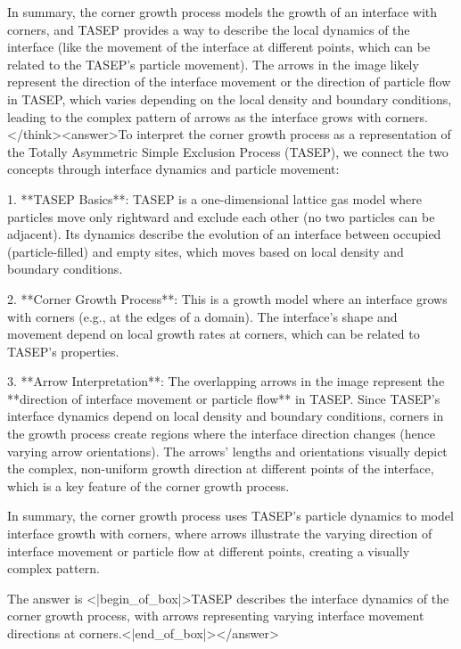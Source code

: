 In summary, the corner growth process models the growth of an interface with corners, and TASEP provides a way to describe the local dynamics of the interface (like the movement of the interface at different points, which can be related to the TASEP's particle movement). The arrows in the image likely represent the direction of the interface movement or the direction of particle flow in TASEP, which varies depending on the local density and boundary conditions, leading to the complex pattern of arrows as the interface grows with corners.</think><answer>To interpret the corner growth process as a representation of the Totally Asymmetric Simple Exclusion Process (TASEP), we connect the two concepts through interface dynamics and particle movement:  

1. **TASEP Basics**: TASEP is a one-dimensional lattice gas model where particles move only rightward and exclude each other (no two particles can be adjacent). Its dynamics describe the evolution of an interface between occupied (particle-filled) and empty sites, which moves based on local density and boundary conditions.  

2. **Corner Growth Process**: This is a growth model where an interface grows with corners (e.g., at the edges of a domain). The interface’s shape and movement depend on local growth rates at corners, which can be related to TASEP’s properties.  

3. **Arrow Interpretation**: The overlapping arrows in the image represent the **direction of interface movement or particle flow** in TASEP. Since TASEP’s interface dynamics depend on local density and boundary conditions, corners in the growth process create regions where the interface direction changes (hence varying arrow orientations). The arrows’ lengths and orientations visually depict the complex, non-uniform growth direction at different points of the interface, which is a key feature of the corner growth process.  

In summary, the corner growth process uses TASEP’s particle dynamics to model interface growth with corners, where arrows illustrate the varying direction of interface movement or particle flow at different points, creating a visually complex pattern.  

The answer is <|begin_of_box|>TASEP describes the interface dynamics of the corner growth process, with arrows representing varying interface movement directions at corners.<|end_of_box|></answer>
